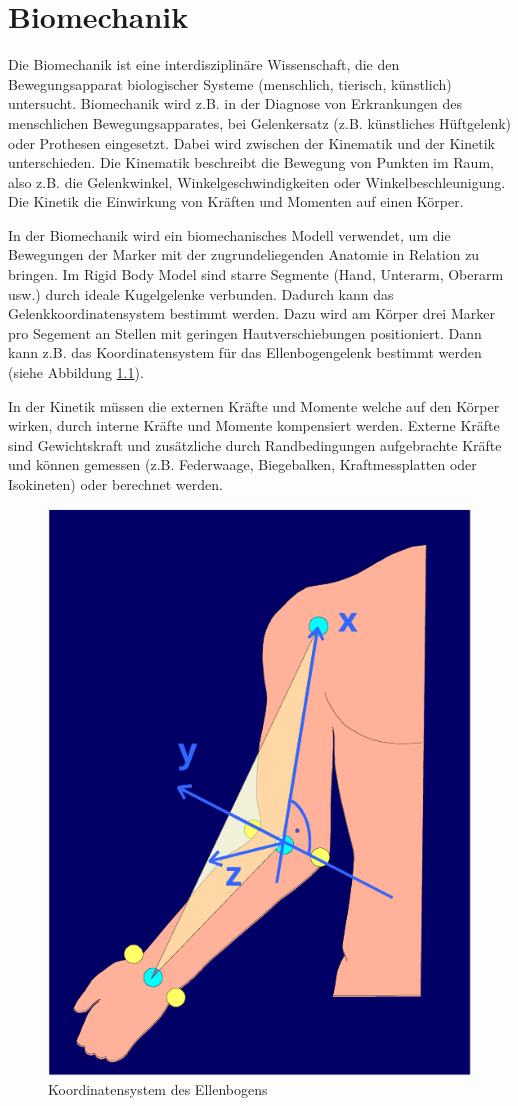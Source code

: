 \chapter{Biomechanik}

Die Biomechanik ist eine interdisziplinäre Wissenschaft, die den Bewegungsapparat biologischer Systeme (menschlich, tierisch, künstlich) untersucht. Biomechanik wird z.B. in der Diagnose von Erkrankungen des menschlichen Bewegungsapparates, bei Gelenkersatz (z.B. künstliches Hüftgelenk) oder Prothesen eingesetzt. Dabei wird zwischen der Kinematik und der Kinetik unterschieden. Die Kinematik beschreibt die Bewegung von Punkten im Raum, also z.B. die Gelenkwinkel, Winkelgeschwindigkeiten oder Winkelbeschleunigung. Die Kinetik die Einwirkung von Kräften und Momenten auf einen Körper.

In der Biomechanik wird ein biomechanisches Modell verwendet, um die Bewegungen der Marker mit der zugrundeliegenden Anatomie in Relation zu bringen. Im Rigid Body Model sind starre Segmente (Hand, Unterarm, Oberarm usw.) durch ideale Kugelgelenke verbunden. Dadurch kann das Gelenkkoordinatensystem bestimmt werden. Dazu wird am Körper drei Marker pro Segement an Stellen mit geringen Hautverschiebungen positioniert. Dann kann z.B. das Koordinatensystem für das Ellenbogengelenk bestimmt werden (siehe Abbildung \ref{fig:ellenbogen}).

In der Kinetik müssen die externen Kräfte und Momente welche auf den Körper wirken, durch interne Kräfte und Momente kompensiert werden. Externe Kräfte sind Gewichtskraft und zusätzliche durch Randbedingungen aufgebrachte Kräfte und können gemessen (z.B. Federwaage, Biegebalken, Kraftmessplatten oder Isokineten) oder berechnet werden.

\begin{figure}[h!]
	\centering
	\includegraphics[width=0.4\linewidth]{fig/ellenbogen}
	\caption{Koordinatensystem des Ellenbogens}
	\label{fig:ellenbogen}
\end{figure}